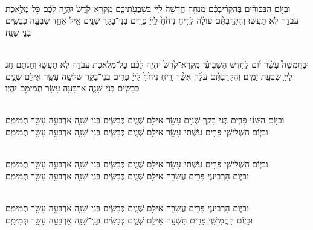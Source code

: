 \documentclass[twoside, openany, parskip=half, 11pt]{book}
\begin{document}
\\
וּבְי֣וֹם  הַבִּכּוּרִ֗ים בְּהַקְרִ֨יבְכֶ֜ם מִנְחָ֤ה חֲדָשָׁה֙ לַֽייָ֔ בְּשָׁבֻעֹ֖תֵיכֶ֑ם מִֽקְרָא־קֹ֙דֶשׁ֙ יִהְיֶ֣ה לָכֶ֔ם כׇּל־מְלֶ֥אכֶת עֲבֹדָ֖ה לֹ֥א תַעֲשֽׂוּ׃ וְהִקְרַבְתֶּ֨ם עוֹלָ֜ה לְרֵ֤יחַ נִיחֹ֙חַ֙ לַֽייָ֔ פָּרִ֧ים בְּנֵי־בָקָ֛ר שְׁנַ֖יִם אַ֣יִל אֶחָ֑ד שִׁבְעָ֥ה כְבָשִׂ֖ים בְּנֵ֥י שָׁנָֽה׃


\\
וּבַחֲמִשָּׁה֩ עָשָׂ֨ר י֜וֹם לַחֹ֣דֶשׁ הַשְּׁבִיעִ֗י מִֽקְרָא־קֹ֙דֶשׁ֙ יִהְיֶ֣ה לָכֶ֔ם כׇּל־מְלֶ֥אכֶת עֲבֹדָ֖ה לֹ֣א תַעֲשׂ֑וּ וְחַגֹּתֶ֥ם חַ֛ג לַייָ֖ שִׁבְעַ֥ת יָמִֽים׃ וְהִקְרַבְתֶּ֨ם עֹלָ֜ה אִשֵּׁ֨ה רֵ֤יחַ נִיחֹ֙חַ֙ לַֽייָ֔ פָּרִ֧ים בְּנֵי־בָקָ֛ר שְׁלֹשָׁ֥ה עָשָׂ֖ר אֵילִ֣ם שְׁנָ֑יִם כְּבָשִׂ֧ים בְּנֵֽי־שָׁנָ֛ה אַרְבָּעָ֥ה עָשָׂ֖ר תְּמִימִ֥ם יִהְיֽוּ׃

\\
וּבַיּ֣וֹם הַשֵּׁנִ֗י פָּרִ֧ים בְּנֵי־בָקָ֛ר שְׁנֵ֥ים עָשָׂ֖ר אֵילִ֣ם שְׁנָ֑יִם כְּבָשִׂ֧ים בְּנֵי־שָׁנָ֛ה אַרְבָּעָ֥ה עָשָׂ֖ר תְּמִימִֽם׃
\\
וּבַיּ֧וֹם הַשְּׁלִישִׁ֛י פָּרִ֥ים עַשְׁתֵּי־עָשָׂ֖ר אֵילִ֣ם שְׁנָ֑יִם כְּבָשִׂ֧ים בְּנֵי־שָׁנָ֛ה אַרְבָּעָ֥ה עָשָׂ֖ר תְּמִימִֽם׃



\\
וּבַיּ֧וֹם הַשְּׁלִישִׁ֛י פָּרִ֥ים עַשְׁתֵּי־עָשָׂ֖ר אֵילִ֣ם שְׁנָ֑יִם כְּבָשִׂ֧ים בְּנֵי־שָׁנָ֛ה אַרְבָּעָ֥ה עָשָׂ֖ר תְּמִימִֽם׃
\\
וּבַיּ֧וֹם הָרְבִיעִ֛י פָּרִ֥ים עֲשָׂרָ֖ה אֵילִ֣ם שְׁנָ֑יִם כְּבָשִׂ֧ים בְּנֵֽי־שָׁנָ֛ה אַרְבָּעָ֥ה עָשָׂ֖ר תְּמִימִֽם׃



\\
וּבַיּ֧וֹם הָרְבִיעִ֛י פָּרִ֥ים עֲשָׂרָ֖ה אֵילִ֣ם שְׁנָ֑יִם כְּבָשִׂ֧ים בְּנֵֽי־שָׁנָ֛ה אַרְבָּעָ֥ה עָשָׂ֖ר תְּמִימִֽם׃
\\
וּבַיּ֧וֹם הַחֲמִישִׁ֛י פָּרִ֥ים תִּשְׁעָ֖ה אֵילִ֣ם שְׁנָ֑יִם כְּבָשִׂ֧ים בְּנֵֽי־שָׁנָ֛ה אַרְבָּעָ֥ה עָשָׂ֖ר תְּמִימִֽם׃
\end{document}
